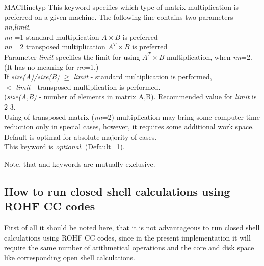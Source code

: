 \begin{keywordlist}
\item[MACHinetyp]
This keyword specifies which type of matrix multiplication is preferred on a given
machine. The following line contains two parameters {\it nn,limit}.\\
{\it nn} =1 standard multiplication ${A \times B}$ is preferred\\
{\it nn} =2 transposed multiplication ${A^{T} \times B}$ is preferred\\
Parameter {\it limit} specifies the limit for using ${A^{T} \times B}$
multiplication, when {\it nn}=2. (It has no meaning for {\it nn}=1.)\\
If {\it size(A)/size(B)} ${\geq}$ {\it limit} - standard multiplication is performed,\\
\hspace*{2ex}{\it size(A)/size(B)} ${<}$ {\it limit} - transposed multiplication is
performed.\\
({\it size(A,B)} - number of elements in matrix A,B).
 Recommended value for {\it limit} is 2-3.\\
Using of transposed matrix ({\it nn}=2)
multiplication may bring some computer time reduction only in special
cases, however, it requires some additional work space. Default is optimal
for absolute majority of cases.\\
This keyword is {\it optional}. (Default=1).
\end{keywordlist}

Note, that  and  keywords are mutually exclusive.
\subsection{How to run closed shell calculations using ROHF CC codes}
\label{sec:ccsdt_cs}

  First of all it should be noted here, that it is not advantageous
to run closed shell calculations using ROHF CC codes, since
in the present implementation it will require the same number of
arithmetical operations and the core and disk space like corresponding
open shell calculations.

